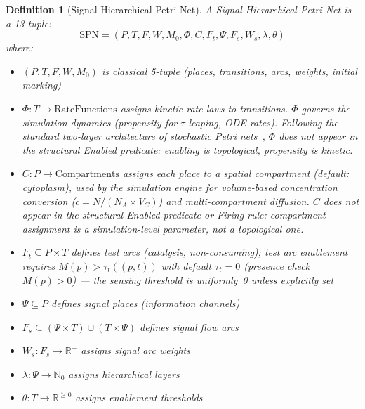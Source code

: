 \documentclass[10pt,letterpaper]{article}
\newtheorem{definition}{Definition}
\begin{document}
\begin{definition}[Signal Hierarchical Petri Net]
A Signal Hierarchical Petri Net is a 13-tuple:
\begin{equation}
\text{SPN} = (P, T, F, W, M_0, \Phi, C, F_t, \Psi, F_s, W_s, \lambda, \theta)
\end{equation}
where:
\begin{itemize}
\item $(P, T, F, W, M_0)$ is classical 5-tuple (places, transitions, arcs, weights, initial marking)
\item $\Phi: T \rightarrow \text{RateFunctions}$ assigns kinetic rate laws to transitions.
  $\Phi$ governs the simulation dynamics (propensity for $\tau$-leaping, ODE rates).
  Following the standard two-layer architecture of stochastic Petri nets~\cite{goss1998},
  $\Phi$ does not appear in the structural Enabled predicate: enabling is topological,
  propensity is kinetic.
\item $C: P \rightarrow \text{Compartments}$ assigns each place to a spatial
  compartment (default: cytoplasm), used by the simulation engine for
  volume-based concentration conversion ($c = N / (N_A \times V_C)$) and
  multi-compartment diffusion.
  $C$ does not appear in the structural Enabled predicate or Firing rule:
  compartment assignment is a simulation-level parameter, not a topological one.
\item $F_t \subseteq P \times T$ defines test arcs (catalysis, non-consuming); test arc
  enablement requires $M(p) > \tau_t((p,t))$ with default $\tau_t = 0$ (presence
  check $M(p) > 0$) --- the sensing threshold is uniformly~0 unless explicitly set
\item $\Psi \subseteq P$ defines signal places (information channels)
\item $F_s \subseteq (\Psi \times T) \cup (T \times \Psi)$ defines signal flow arcs
\item $W_s: F_s \rightarrow \mathbb{R}^+$ assigns signal arc weights
\item $\lambda: \Psi \rightarrow \mathbb{N}_0$ assigns hierarchical layers
\item $\theta: T \rightarrow \mathbb{R}^{\geq 0}$ assigns enablement thresholds
\end{itemize}
\end{definition}
\end{document}
